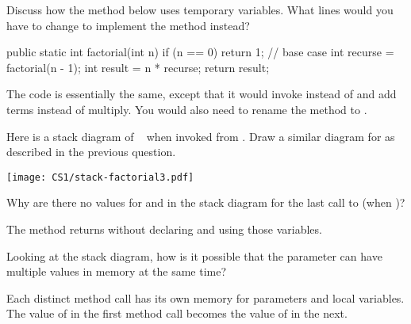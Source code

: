 \Q Discuss how the  method below uses temporary variables.
What lines would you have to change to implement the  method instead?

\begin{multicols}{2}

\vspace{1ex}
\begin{javalst}
public static int factorial(int n) {
    if (n == 0) {
        return 1;  // base case
    }
    int recurse = factorial(n - 1);
    int result = n * recurse;
    return result;
}
\end{javalst}

\columnbreak

\begin{answer}
The code is essentially the same, except that it would invoke  instead of  and add terms instead of multiply.
You would also need to rename the method to .
\end{answer}

\end{multicols}


\Q Here is a stack diagram of ~ when invoked from .
Draw a similar diagram for  as described in the previous question.

\vspace{1em}
\texttt{[image: CS1/stack-factorial3.pdf]}
\vspace{1em}



\Q Why are there no values for  and  in the stack diagram for the last call to  (when )?

\begin{answer}
The method returns without declaring and using those variables.
\end{answer}


\Q Looking at the stack diagram, how is it possible that the parameter  can have multiple values in memory at the same time?

\begin{answer}
Each distinct method call has its own memory for parameters and local variables.
The value of  in the first method call becomes the value of  in the next.
\end{answer}
